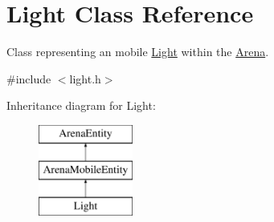 \hypertarget{class_light}{}\section{Light Class Reference}
\label{class_light}


Class representing an mobile \hyperlink{class_light}{Light} within the \hyperlink{class_arena}{Arena}.  




{\ttfamily \#include $<$light.\+h$>$}

Inheritance diagram for Light\+:\begin{figure}[H]
\begin{center}
\leavevmode
\includegraphics[height=3.000000cm]{class_light}
\end{center}
\end{figure}

